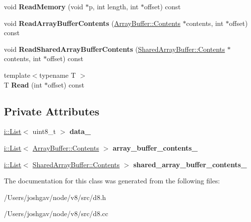 \begin{DoxyCompactItemize}
\item 
void {\bfseries Read\+Memory} (void $\ast$p, int length, int $\ast$offset) const \hypertarget{classv8_1_1_serialization_data_a3fefef8f0725898684f17bd9105b87c0}{}\label{classv8_1_1_serialization_data_a3fefef8f0725898684f17bd9105b87c0}

\item 
void {\bfseries Read\+Array\+Buffer\+Contents} (\hyperlink{classv8_1_1_array_buffer_1_1_contents}{Array\+Buffer\+::\+Contents} $\ast$contents, int $\ast$offset) const \hypertarget{classv8_1_1_serialization_data_a77cd283db6473f585006297ba18968bc}{}\label{classv8_1_1_serialization_data_a77cd283db6473f585006297ba18968bc}

\item 
void {\bfseries Read\+Shared\+Array\+Buffer\+Contents} (\hyperlink{classv8_1_1_shared_array_buffer_1_1_contents}{Shared\+Array\+Buffer\+::\+Contents} $\ast$contents, int $\ast$offset) const \hypertarget{classv8_1_1_serialization_data_a24050d527559dacd509233bcc657dd17}{}\label{classv8_1_1_serialization_data_a24050d527559dacd509233bcc657dd17}

\item 
{\footnotesize template$<$typename T $>$ }\\T {\bfseries Read} (int $\ast$offset) const \hypertarget{classv8_1_1_serialization_data_afeaf3eebe869d6080f21dfd804038142}{}\label{classv8_1_1_serialization_data_afeaf3eebe869d6080f21dfd804038142}

\end{DoxyCompactItemize}
\subsection*{Private Attributes}
\begin{DoxyCompactItemize}
\item 
\hyperlink{classv8_1_1internal_1_1_list}{i\+::\+List}$<$ uint8\+\_\+t $>$ {\bfseries data\+\_\+}\hypertarget{classv8_1_1_serialization_data_a519b7f4958f0a8e7d4a4233785fbc0f0}{}\label{classv8_1_1_serialization_data_a519b7f4958f0a8e7d4a4233785fbc0f0}

\item 
\hyperlink{classv8_1_1internal_1_1_list}{i\+::\+List}$<$ \hyperlink{classv8_1_1_array_buffer_1_1_contents}{Array\+Buffer\+::\+Contents} $>$ {\bfseries array\+\_\+buffer\+\_\+contents\+\_\+}\hypertarget{classv8_1_1_serialization_data_a2a9a72997a690e9171e5203a03b2c9fe}{}\label{classv8_1_1_serialization_data_a2a9a72997a690e9171e5203a03b2c9fe}

\item 
\hyperlink{classv8_1_1internal_1_1_list}{i\+::\+List}$<$ \hyperlink{classv8_1_1_shared_array_buffer_1_1_contents}{Shared\+Array\+Buffer\+::\+Contents} $>$ {\bfseries shared\+\_\+array\+\_\+buffer\+\_\+contents\+\_\+}\hypertarget{classv8_1_1_serialization_data_a3ac3f53231866a6cb079f2f34844212f}{}\label{classv8_1_1_serialization_data_a3ac3f53231866a6cb079f2f34844212f}

\end{DoxyCompactItemize}


The documentation for this class was generated from the following files\+:\begin{DoxyCompactItemize}
\item 
/\+Users/joshgav/node/v8/src/d8.\+h\item 
/\+Users/joshgav/node/v8/src/d8.\+cc\end{DoxyCompactItemize}
